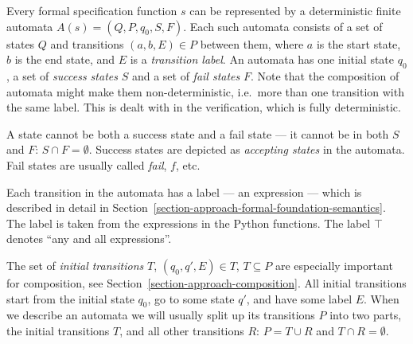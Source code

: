 \begin{mydef}\label{def-automata}
Every formal specification function $s$ can be represented by a deterministic
finite automata $A(s) = (Q, P, q_0, S, F)$. Each such automata consists of a
set of states $Q$ and transitions $(a, b, E) \in P$ between them, where $a$ is
the start state, $b$ is the end state, and $E$ is a \textit{transition label}.
An automata has one initial state $q_0$, a set of \textit{success states} $S$
and a set of \textit{fail states} $F$. Note that the composition of automata
might make them non-deterministic, i.e.\ more than one transition with the same
label. This is dealt with in the verification, which is fully deterministic.
\end{mydef}

\begin{mydef}\label{def-success-and-fail-states}
A state cannot be both a success state and a fail state --- it cannot be in
both $S$ and $F$: $S \cap F = \emptyset$. Success states are depicted as
\textit{accepting states} in the automata. Fail states are usually called
\textit{fail}, $f$, etc.
\end{mydef}

\begin{mydef}\label{def-transition-labels}
Each transition in the automata has a label --- an expression --- which is
described in detail in
Section~\ref{section-approach-formal-foundation-semantics}. The label is taken
from the expressions in the Python functions. The label $\top$ denotes ``any
and all expressions''.
\end{mydef}

\begin{mydef}\label{def-initial-transitions}
The set of \textit{initial transitions} $T$, $(q_0, q', E) \in T$, $T \subseteq
P$ are especially important for composition, see
Section~\ref{section-approach-composition}. All initial transitions start from
the initial state $q_0$, go to some state $q'$, and have some label $E$. When
we describe an automata we will usually split up its transitions $P$ into two
parts, the initial transitions $T$, and all other transitions $R$: $P = T \cup
R$ and $T \cap R = \emptyset$.
\end{mydef}

